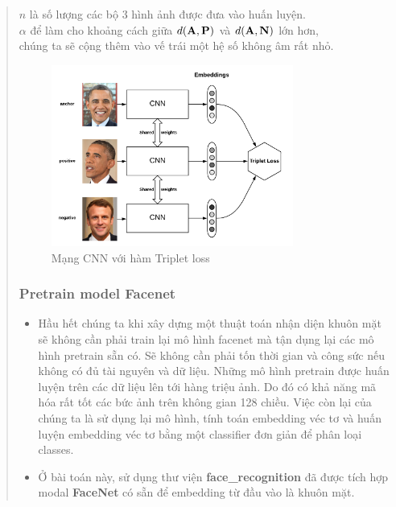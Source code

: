 \documentclass{article}
\begin{document}
\begin{quote}
\begin{itemize}
\begin{itemize}
\begin{center}
            \begin{math}n\end{math} là số lượng các bộ 3 hình ảnh được đưa vào huấn luyện.
            \\
            \begin{math}\alpha\end{math} để làm cho khoảng cách giữa 
            \begin{math}\mathnormal{d}(\mathbf{A},\mathbf{P})\end{math} và
            \begin{math}\mathnormal{d}(\mathbf{A},\mathbf{N})\end{math} lớn hơn,
            \\
            chúng ta sẽ cộng thêm vào vế trái một hệ số không âm rất nhỏ.
         \end{center}
   \begin{figure}[H]
      \centering
      \includegraphics[width=300px]{triplet_loss.png}
      \caption{Mạng CNN với hàm Triplet loss}
   \end{figure}
   \end{itemize}
   \subsubsection{Pretrain model Facenet}
   \begin{itemize}
      \item Hầu hết chúng ta khi xây dựng một thuật toán nhận diện khuôn mặt sẽ không cần phải train lại mô hình facenet mà tận dụng lại các mô hình pretrain sẵn có. Sẽ không cần phải tốn thời gian và công sức nếu không có đủ tài nguyên và dữ liệu.
      Những mô hình pretrain được huấn luyện trên các dữ liệu lên tới hàng triệu ảnh. Do đó có khả năng mã hóa rất tốt các bức ảnh trên không gian 128 chiều. Việc còn lại của chúng ta là sử dụng lại mô hình, tính toán embedding véc tơ và huấn luyện embedding véc tơ bằng một classifier đơn giản để phân loại classes.
      \item Ở bài toán này, sử dụng thư viện \textbf{face\_recognition} đã được tích hợp modal \textbf{FaceNet} có sẵn để embedding từ đầu vào là khuôn mặt.
   \end{itemize}


\end{itemize}
\end{quote}
\end{document}
